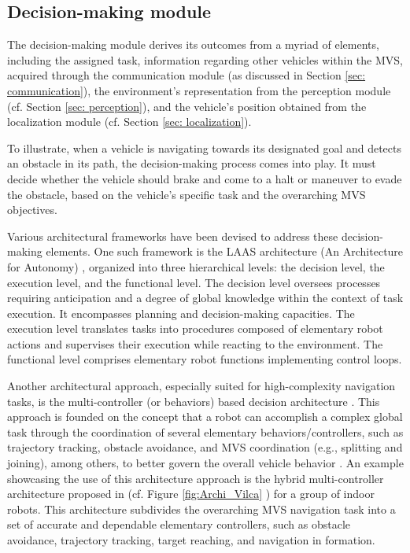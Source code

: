      
     \subsection{Decision-making module} \label{sec: Decision-making} 
     The decision-making module derives its outcomes from a myriad of elements, including the assigned task, information regarding other vehicles within the MVS, acquired through the communication module (as discussed in Section \ref{sec: communication}), the environment's representation from the perception module (cf. Section \ref{sec: perception}), and the vehicle's position obtained from the localization module (cf. Section \ref{sec: localization}). 

    To illustrate, when a vehicle is navigating towards its designated goal and detects an obstacle in its path, the decision-making process comes into play. It must decide whether the vehicle should brake and come to a halt or maneuver to evade the obstacle, based on the vehicle's specific task and the overarching MVS objectives. 

    Various architectural frameworks have been devised to address these decision-making elements. One such framework is the LAAS architecture (An Architecture for Autonomy) \cite{alami1998architecture}, organized into three hierarchical levels: the decision level, the execution level, and the functional level. The decision level oversees processes requiring anticipation and a degree of global knowledge within the context of task execution. It encompasses planning and decision-making capacities. The execution level translates tasks into procedures composed of elementary robot actions and supervises their execution while reacting to the environment. The functional level comprises elementary robot functions implementing control loops. 

    Another architectural approach, especially suited for high-complexity navigation tasks, is the multi-controller (or behaviors) based decision architecture \cite{adouane2016autonomous}. This approach is founded on the concept that a robot can accomplish a complex global task through the coordination of several elementary behaviors/controllers, such as trajectory tracking, obstacle avoidance, and MVS coordination (e.g., splitting and joining), among others, to better govern the overall vehicle behavior \cite{adouane2016autonomous}. An example showcasing the use of this architecture approach is the hybrid multi-controller architecture proposed in \cite{ventura2015safe} (cf. Figure \ref{fig:Archi_Vilca} ) for a group of indoor robots. This architecture subdivides the overarching MVS navigation task into a set of accurate and dependable elementary controllers, such as obstacle avoidance, trajectory tracking, target reaching, and navigation in formation.  

